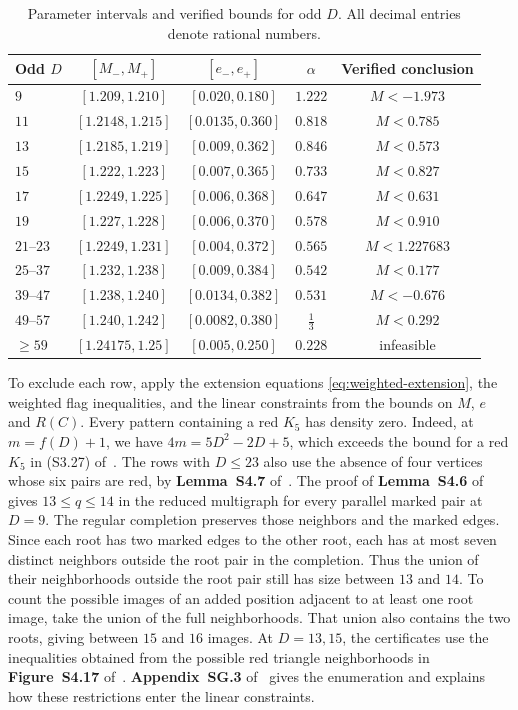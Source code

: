 \documentclass[preprint,11pt,numbers]{elsarticle-arxiv}
\numberwithin{equation}{section}
\theoremstyle{definition}
\begin{document}
\begin{table}[t]
\centering
\small
\begin{tabular}{@{}lcccc@{}}
\toprule
Odd $D$ & $[M_-,M_+]$ & $[e_-,e_+]$ & $\alpha$ & Verified conclusion\\
\midrule
$9$        & $[1.209,1.210]$  & $[0.020,0.180]$   & $1.222$ & $M<-1.973$\\
$11$       & $[1.2148,1.215]$ & $[0.0135,0.360]$  & $0.818$ & $M<0.785$\\
$13$       & $[1.2185,1.219]$ & $[0.009,0.362]$   & $0.846$ & $M<0.573$\\
$15$       & $[1.222,1.223]$  & $[0.007,0.365]$   & $0.733$ & $M<0.827$\\
$17$       & $[1.2249,1.225]$ & $[0.006,0.368]$   & $0.647$ & $M<0.631$\\
$19$       & $[1.227,1.228]$  & $[0.006,0.370]$   & $0.578$ & $M<0.910$\\
$21$--$23$ & $[1.2249,1.231]$ & $[0.004,0.372]$   & $0.565$ & $M<1.227683$\\
$25$--$37$ & $[1.232,1.238]$  & $[0.009,0.384]$   & $0.542$ & $M<0.177$\\
$39$--$47$ & $[1.238,1.240]$  & $[0.0134,0.382]$  & $0.531$ & $M<-0.676$\\
$49$--$57$ & $[1.240,1.242]$  & $[0.0082,0.380]$  & $\frac{1}{3}$ & $M<0.292$\\
$\ge59$    & $[1.24175,1.25]$ & $[0.005,0.250]$   & $0.228$ & infeasible\\
\bottomrule
\end{tabular}
\caption{Parameter intervals and verified bounds for odd $D$.
All decimal entries denote rational numbers.}
\label{tab:multi-odd}
\end{table}

To exclude each row, apply the extension equations
\eqref{eq:weighted-extension}, the weighted flag inequalities,
and the linear constraints from the bounds on $M$, $e$ and $R(C)$.
Every pattern containing a red $K_5$ has density zero. Indeed,
at $m=f(D)+1$, we have $4m=5D^2-2D+5$, which exceeds the bound
for a red $K_5$ in (S3.27) of~\cite{FGSTSupplement}.
The rows with $D\leq23$ also use the absence of four vertices
whose six pairs are red, by \textbf{Lemma~S4.7}
of~\cite{FGSTSupplement}. The proof of \textbf{Lemma~S4.6}
of~\cite{FGSTSupplement} gives $13\leq q\leq14$ in the reduced
multigraph for every parallel marked pair at $D=9$. The regular
completion preserves those neighbors and the marked edges.
Since each root has two marked edges to the other root, each
has at most seven distinct neighbors outside the root pair
in the completion. Thus the union of their neighborhoods outside
the root pair still has size between $13$ and $14$. To count the
possible images of an added position adjacent to at least one
root image, take the union of the full neighborhoods. That union
also contains the two roots, giving between $15$ and $16$ images.
At $D=13,15$, the
certificates use the inequalities
obtained from the possible red triangle neighborhoods in
\textbf{Figure~S4.17} of~\cite{FGSTSupplement}.
\textbf{Appendix~SG.3} of~\cite{FGSTSupplement}
gives the enumeration and explains how these restrictions enter
the linear constraints.
\end{document}
